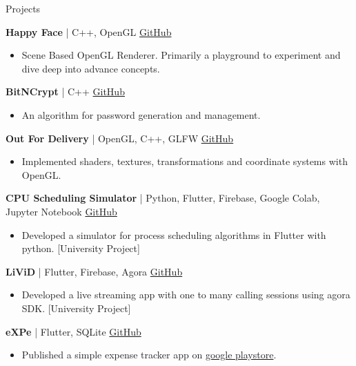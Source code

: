 \documentclass{resume}
\begin{document}
\begin{rSection}{Projects}
\vspace{-1em}

\item \textbf{Happy Face} | {C++, OpenGL} \hfill \href{https://github.com/JayNakum/HappyFace}{GitHub}
\begin{itemize}
    \item Scene Based OpenGL Renderer. Primarily a playground to experiment and dive deep into advance concepts.
 \end{itemize}

 \item \textbf{BitNCrypt} | {C++} \hfill \href{https://github.com/JayNakum/BitNCrypt}{GitHub}
\begin{itemize}
    \item  An algorithm for password generation and management.
 \end{itemize}

\item \textbf{Out For Delivery} | {OpenGL, C++, GLFW} \hfill \href{https://github.com/JayNakum/OutForDelivery}{GitHub}
\begin{itemize}
    \item Implemented shaders, textures, transformations and coordinate systems with OpenGL.
 \end{itemize}

\item \textbf{CPU Scheduling Simulator} | {Python, Flutter, Firebase, Google Colab, Jupyter Notebook} \hfill \href{https://github.com/JayNakum/OperatingSystemsProject}{GitHub}
\begin{itemize}
    \item Developed a simulator for process scheduling algorithms in Flutter with python. [University Project]
 \end{itemize}

\item \textbf{LiViD} | {Flutter, Firebase, Agora} \hfill \href{https://github.com/JayNakum/LiViD}{GitHub}
\begin{itemize}
     \item Developed a live streaming app with one to many calling sessions using agora SDK. [University Project]
 \end{itemize}

\item \textbf{eXPe} | {Flutter, SQLite} \hfill \href{https://github.com/JayNakum/eXPe}{GitHub}
\begin{itemize}
     \item Published a simple expense tracker app on \href{https://play.google.com/store/apps/details?id=io.github.jaynakum.expe&pcampaignid=pcampaignidMKT-Other-global-all-co-prtnr-py-PartBadge-Mar2515-1}{google playstore}.
 \end{itemize}
\end{rSection}
\end{document}
